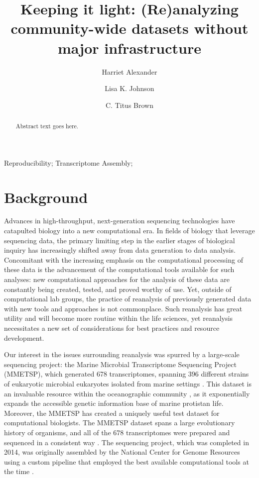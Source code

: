 \documentclass[a4paper,num-refs]{oup-contemporary}
\title{Keeping it light: (Re)analyzing community-wide datasets without major infrastructure}
\author[1]{Harriet Alexander}
\author[1]{Lisa K. Johnson}
\author[1,\authfn{1}]{C. Titus Brown}
\affil[1]{Population Health and Reproduction, University of California, Davis, CA, USA}
\begin{document}
\begin{frontmatter}
\maketitle

  \begin{abstract}
Abstract text goes here.
  \end{abstract}

\begin{keywords}
Reproducibility; Transcriptome Assembly;
\end{keywords}
\end{frontmatter}

\section{Background}
Advances in high-throughput, next-generation sequencing technologies have catapulted biology into a new computational era. In fields of biology that leverage sequencing data, the primary limiting step in the earlier stages of biological inquiry has increasingly shifted away from data generation to data analysis. Concomitant with the increasing emphasis on the computational processing of these data is the advancement of the computational tools available for such analyses: new computational approaches for the analysis of these data are constantly being created, tested, and proved worthy of use. Yet, outside of computational lab groups, the practice of reanalysis of previously generated data with new tools and approaches is not commonplace. Such reanalysis has great utility and will become more routine within the life sciences, yet reanalysis necessitates a new set of considerations for best practices and resource development.



Our interest in the issues surrounding reanalysis was spurred by a large-scale sequencing project: the Marine Microbial Transcriptome Sequencing Project (MMETSP), which generated 678 transcriptomes, spanning 396 different strains of eukaryotic microbial eukaryotes isolated from marine settings \cite{Caron2016}. This dataset is an invaluable resource within the oceanographic community \cite{Keeling2014, Caron2016}, as it exponentially expands the accessible genetic information base of marine protistan life. Moreover, the MMETSP has created a uniquely useful test dataset for computational biologists. The MMETSP dataset spans a large evolutionary history of organisms, and all of the 678 transcriptomes were prepared and sequenced in a consistent way \cite{Keeling2014}. The sequencing project, which was completed in 2014, was originally assembled by the National Center for Genome Resources using a custom pipeline that employed the best available computational tools at the time \cite{Simpson2009, Huang1999}.
\end{document}
